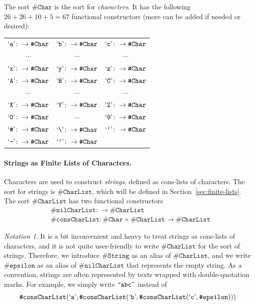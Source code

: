 \documentclass[UTF8,11pt]{article}
\newcounter{thmcounter}
\theoremstyle{plain}
\theoremstyle{definition}
\theoremstyle{remark}
\newtheorem{notation}   [thmcounter]{Notation}
\newcommand{\sharpsymbol}{\#}
\newcommand{\KChar}{\texttt{\sharpsymbol Char}}
\newcommand{\KCharList}{\texttt{\sharpsymbol CharList}}
\newcommand{\KString}{\texttt{\sharpsymbol String}}
\newcommand{\Kepsilon}{\texttt{\sharpsymbol epsilon}}
\newcommand{\KnilKCharList}{\texttt{\sharpsymbol nilCharList}}
\newcommand{\KconsKCharList}{\texttt{\sharpsymbol consCharList}}
\newcommand{\quottt}[1]{\textrm{\lq\texttt{#1}\rq}}
\newcommand{\qquottt}[1]{\textrm{``\texttt{#1}''}}
\newcommand{\slashsymbol}{\symbol{92}}
\begin{document}
The sort $\KChar$ is the sort for \emph{characters}. It has the following $26 + 
26 + 10 + 5 = 67$ functional constructors (more can be added if needed or
desired):
\begin{center}
	\begin{tabular}{c c c}
		$\quottt{a} \colon \to \KChar$ & $\quottt{b} \colon \to \KChar$ & 
		$\quottt{c} \colon \to \KChar$ \\
		$\cdots$ & $\cdots$ & $\cdots$ \\
		$\quottt{x} \colon \to \KChar$ & $\quottt{y} \colon \to \KChar$ & 
		$\quottt{z} \colon \to \KChar$ \\
		$\quottt{A} \colon \to \KChar$ & $\quottt{B} \colon \to \KChar$ & 
		$\quottt{C} \colon \to \KChar$ \\
		$\cdots$ & $\cdots$ & $\cdots$ \\
		$\quottt{X} \colon \to \KChar$ & $\quottt{Y} \colon \to \KChar$ & 
		$\quottt{Z} \colon \to \KChar$ \\
		$\quottt{0} \colon \to \KChar$ & $\cdots$ & $\quottt{9} \colon \to 
		\KChar$ 
		\\
		$\quottt{\sharpsymbol} \colon \to \KChar$ & $\quottt{\slashsymbol} 
		\colon \to \KChar$ & $\quottt{`} \colon \to \KChar$
		\\
		$\quottt{-} \colon \to \KChar$ & $\quottt{'} \colon \to \KChar$
	\end{tabular}
\end{center}

\paragraph{Strings as Finite Lists of Characters.}
Characters are used to construct \emph{strings}, defined as cons-lists of 
characters.
The sort for strings is $\KCharList$, which will be defined in 
Section~\ref{sec:finite-lists}.
The sort $\KCharList$ has two functional constructors
\begin{align*}
& \KnilKCharList \colon \to \KCharList \\
& \KconsKCharList \colon \KChar \times \KCharList \to \KCharList
\end{align*}

\begin{notation}\label{not:strings}
It is a bit inconvenient and heavy to treat strings as cons-lists of 
characters, and it is not quite user-friendly to write $\KCharList$ for the 
sort of strings.
Therefore, we introduce $\KString$ as an alias of $\KCharList$, and we write 
$\Kepsilon$ as an alias of $\KnilKCharList$ that represents the empty string.
As a convention, strings are often represented by texts wrapped with
double-quotation marks. 
For example, we simply write $\qquottt{abc}$ instead of
	$$
	\KconsKCharList(\quottt{a}, \KconsKCharList(\quottt{b}, 
	\KconsKCharList(\quottt{c}, \Kepsilon)))
	$$
\end{notation}
\end{document}
